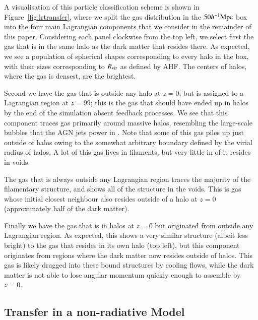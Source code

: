 
A visualisation of this particle classification scheme is shown in Figure~\ref{fig:lrtransfer}, where we split the gas distribution in the \simba{} $50h^{-1}{\rm Mpc}{}$ box into the four main Lagrangian components that we consider in the
remainder of this paper. Considering each panel clockwise from the top left,
we select first the gas that is in the same halo as the dark matter that resides there.
As expected, we see a population of spherical shapes corresponding to every halo in the box, with their sizes corresponding to $R_{\rm vir}$ as defined by AHF. The centers of halos, where the gas is densest,
are the brightest.

Second we have the gas that is outside any halo at $z=0$, but is assigned
to a Lagrangian region at $z=99$; this is the gas that should have ended up in halos by
the end of the simulation absent feedback processes. We see that this component traces gas primarily around massive halos, resembling the large-scale bubbles that
the AGN jets power in \simba{} \citep{Dave2019}.  Note that some of this gas piles up just outside of halos owing to the somewhat arbitrary boundary defined by the virial radius of halos. A lot of this gas lives in filaments, but very little in of it resides
in voids.


The gas that is always outside any Lagrangian region traces the majority of the
filamentary structure, and shows all of the structure in the voids. This is
gas whose initial closest neighbour also resides outside of a halo at $z=0$ (approximately half of the dark matter).

Finally we have the gas that is in halos at $z=0$ but originated from outside any Lagrangian region. As expected, this shows a very similar structure (albeit less bright) to the gas that resides in its own halo (top left), but this component originates from regions where the dark matter now resides outside of halos. This gas is likely dragged into these
bound structures by cooling flows, while the dark matter is not able to lose
angular momentum quickly enough to assemble by $z=0$.


\subsection{Transfer in a non-radiative Model}

